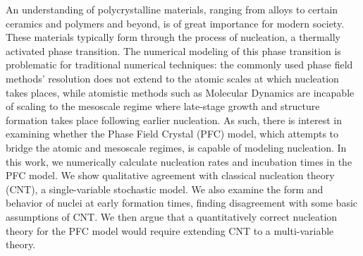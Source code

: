 
An understanding of polycrystalline materials, ranging from alloys to certain ceramics and polymers and beyond, is of great importance for modern society. These materials typically form through the process of nucleation, a thermally activated phase transition. The numerical modeling of this phase transition is problematic for traditional numerical techniques: the commonly used phase field methods' resolution does not extend to the atomic scales at which nucleation takes places, while atomistic methods such as Molecular Dynamics are incapable of scaling to the mesoscale regime where late-stage growth and structure formation takes place following earlier nucleation. As such, there is interest in examining whether the Phase Field Crystal (PFC) model, which attempts to bridge the atomic and mesoscale regimes, is capable of modeling nucleation. In this work, we numerically calculate nucleation rates and incubation times in the PFC model. We show qualitative agreement with classical nucleation theory (CNT), a single-variable stochastic model. We also examine the form and behavior of nuclei at early formation times, finding disagreement with some basic assumptions of CNT. We then argue that a quantitatively correct nucleation theory for the PFC model would require extending CNT to a multi-variable theory.